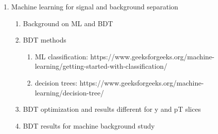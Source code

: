\begin{enumerate}
    \item Machine learning for signal and background separation
    \begin{enumerate}
        \item Background on ML and BDT
        \item BDT methods
        \begin{enumerate}
            \item ML classification: https://www.geeksforgeeks.org/machine-learning/getting-started-with-classification/
            \item decision trees: https://www.geeksforgeeks.org/machine-learning/decision-tree/
        \end{enumerate}
        \item BDT optimization and results different for y and pT slices
        \item BDT results for machine background study
    \end{enumerate}
        
\end{enumerate}
